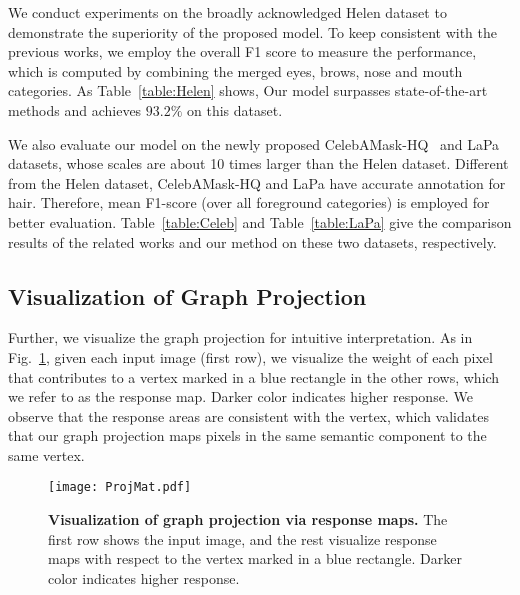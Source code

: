 \documentclass[runningheads]{llncs}
\begin{document}
We conduct experiments on the broadly acknowledged Helen dataset to demonstrate the superiority of the proposed model. 
To keep consistent with the previous works\cite{liu2017face,lin2019face,wei2019accurate,yin2020end,liu2020new}, we employ the overall F1 score to measure the performance, which is computed by combining the merged eyes, brows, nose and mouth categories. As Table~\ref{table:Helen} shows, Our model surpasses state-of-the-art methods and achieves $93.2\%$ on this dataset. 


We also evaluate our model on the newly proposed CelebAMask-HQ~\cite{CelebAMask-HQ} and LaPa~\cite{liu2020new} datasets, whose scales are about 10 times larger than the Helen dataset. Different from the Helen dataset, CelebAMask-HQ and LaPa have accurate annotation for hair. Therefore, mean F1-score (over all foreground categories) is employed for better evaluation. Table~\ref{table:Celeb} and Table~\ref{table:LaPa} give the comparison results of the related works and our method on these two datasets, respectively.













\subsection{Visualization of Graph Projection}

Further, we visualize the graph projection for intuitive interpretation. 
As in Fig.~\ref{fig:mat_vis}, given each input image (first row), we visualize the weight of each pixel that contributes to a vertex marked in a blue rectangle in the other rows, which we refer to as the response map. 
Darker color indicates higher response. 
We observe that the response areas are consistent with the vertex, which validates that our graph projection maps pixels in the same semantic component to the same vertex. 




\begin{figure}[t]
    \centering
    \texttt{[image: ProjMat.pdf]}
    \caption{\textbf{Visualization of graph projection via response maps.} The first row shows the input image, and the rest visualize response maps with respect to the vertex marked in a blue rectangle. Darker color indicates higher response.  }
    \label{fig:mat_vis}
\end{figure}
\end{document}
